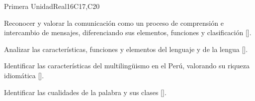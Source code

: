 \begin{syllabus}
\begin{unit}{Primera Unidad}{}{Real}{16}{C17,C20}
\begin{learningoutcomes}
   \item Reconocer y valorar la comunicación como un proceso de comprensión e intercambio de mensajes, diferenciando sus elementos, funciones y clasificación [\Usage].
   \item Analizar las características, funciones y elementos del lenguaje y de la lengua [\Usage].
   \item Identificar las características del multilingüismo en el Perú, valorando su riqueza idiomática [\Usage].
   \item Identificar las cualidades de la palabra y sus clases [\Usage].
\end{learningoutcomes}
\end{unit}

\begin{coursebibliography}
\end{coursebibliography}

\end{syllabus}
